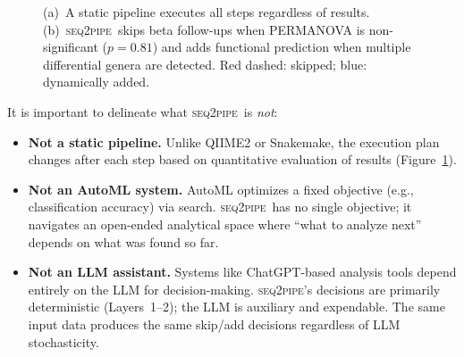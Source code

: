 \documentclass[11pt,a4paper]{article}
\newcommand{\seqpipe}{\textsc{seq2pipe}}
\begin{document}
\begin{figure}[t]
\centering
{}
\caption{(a)~A static pipeline executes all steps regardless of results.
(b)~\seqpipe\ skips beta follow-ups when PERMANOVA is non-significant
($p = 0.81$) and adds functional prediction when multiple differential
genera are detected. Red dashed: skipped; blue: dynamically added.}
\label{fig:static-vs-adaptive}
\end{figure}

It is important to delineate what \seqpipe\ is \emph{not}:

\begin{itemize}
  \item \textbf{Not a static pipeline.}
    Unlike QIIME2 or Snakemake, the execution plan changes after
    each step based on quantitative evaluation of results
    (Figure~\ref{fig:static-vs-adaptive}).

  \item \textbf{Not an AutoML system.}
    AutoML optimizes a fixed objective (e.g., classification accuracy)
    via search.
    \seqpipe\ has no single objective; it navigates an open-ended
    analytical space where ``what to analyze next'' depends on
    what was found so far.

  \item \textbf{Not an LLM assistant.}
    Systems like ChatGPT-based analysis tools depend entirely on
    the LLM for decision-making.
    \seqpipe's decisions are primarily deterministic
    (Layers~1--2); the LLM is auxiliary and expendable.
    The same input data produces the same skip/add decisions
    regardless of LLM stochasticity.
\end{itemize}
\end{document}
